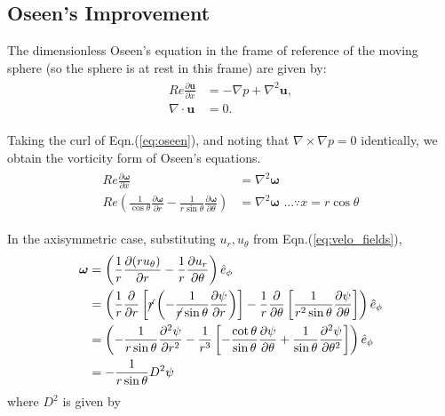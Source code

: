 \documentclass{article}
\begin{document}
\subsection*{Oseen's Improvement }
The dimensionless Oseen's equation in the frame of reference of the moving sphere (so the sphere is at rest in this frame) are given by:
\begin{align}\label{eq:oseen}
 \begin{split}
  Re \frac{\partial \boldsymbol{u}}{\partial x} &= -\nabla p + \nabla^{2} \boldsymbol{u},\\
 \nabla \cdot \boldsymbol{u} &= 0.
 \end{split}
\end{align}

Taking the curl of Eqn.(\ref{eq:oseen}), and noting that $\nabla \times \nabla p = 0$ identically, we obtain the vorticity form of Oseen's equations.
\begin{align}\label{eq:oseen_vort}
 \begin{split}
  Re \frac{\partial \boldsymbol{\omega}}{\partial x} &= \nabla^{2} \boldsymbol{\omega}\\
  Re \left(\frac{1}{\cos{\theta}}\frac{\partial \boldsymbol{\omega}}{\partial r} - \frac{1}{r\sin{\theta}} \frac{\partial \boldsymbol{\omega}}{\partial \theta} \right)&= \nabla^{2} \boldsymbol{\omega} \textrm{ ...}\because x = r\cos{\theta}
 \end{split}
\end{align}

In the axisymmetric case, substituting $u_{r}, u_{\theta}$ from Eqn.(\ref{eq:velo_fields}),
\begin{align}\label{eq:omega}
 \begin{split}
  \boldsymbol{\omega} &= \left(\frac{1}{r} \frac{\partial (r u_{\theta})}{\partial r} - \frac{1}{r}\frac{\partial u_{r}}{\partial \theta}\right) \hat{e}_{\phi} \\
  &= \left(\frac{1}{r} \frac{\partial }{\partial r} \left[\cancel{r} \left(  -\frac{1}{\cancel{r}\sin{\theta}}\frac{\partial \psi}{\partial r} \right) \right]- \frac{1}{r}\frac{\partial }{\partial \theta}\left[ \frac{1}{r^{2}\sin{\theta}}\frac{\partial \psi}{\partial \theta} \right]\right) \hat{e}_{\phi}\\
  & = \left(-\frac{1}{r\sin{\theta}}\frac{\partial^{2} \psi}{\partial r^{2}} - \frac{1}{r^{3}}\left[-\frac{\cot{\theta}}{\sin{\theta}} \frac{\partial \psi}{\partial \theta} + \frac{1}{\sin{\theta}} \frac{\partial^{2}\psi}{\partial\theta^{2}} \right]\right) \hat{e}_{\phi}\\
  & = -\frac{1}{r\sin{\theta}} D^{2} \psi
 \end{split}
\end{align}
where $D^{2}$ is given by
\end{document}

